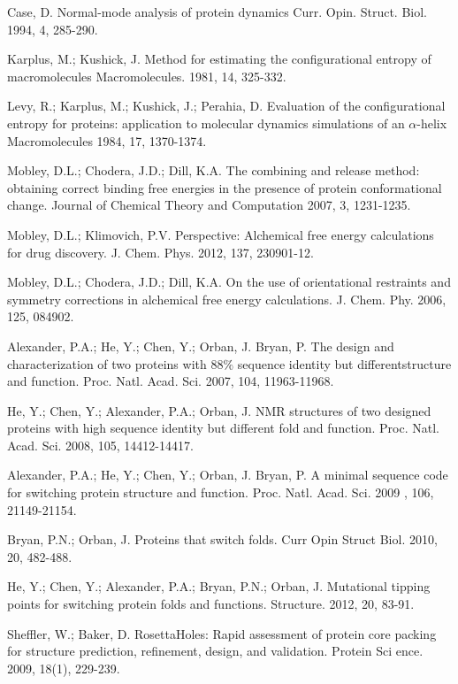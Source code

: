 \documentclass[12pt]{article}
\begin{document}
\begin{thebibliography}{99}
Case, D. Normal-mode analysis of protein dynamics Curr. Opin. Struct. Biol. 1994, 4, 285-290.

Karplus, M.; Kushick, J. Method for estimating the configurational entropy of macromolecules Macromolecules. 1981, 14, 325-332.

Levy, R.; Karplus, M.; Kushick, J.; Perahia, D. Evaluation of the configurational entropy for proteins: application to molecular dynamics simulations of 
an $\alpha$-helix Macromolecules 1984, 17, 1370-1374.

Mobley, D.L.; Chodera, J.D.; Dill, K.A. The combining and release method: obtaining correct binding free energies in
the presence of protein conformational change. Journal of Chemical Theory and Computation 2007, 3, 1231-1235.

Mobley, D.L.; Klimovich, P.V. Perspective: Alchemical free energy calculations for drug discovery.
J. Chem. Phys. 2012, 137, 230901-12.

Mobley, D.L.; Chodera, J.D.; Dill, K.A. On the use of orientational restraints and symmetry corrections in alchemical
free energy calculations. J. Chem. Phy. 2006, 125, 084902.


Alexander, P.A.; He, Y.; Chen, Y.; Orban, J. Bryan, P. The design and characterization of two proteins with $88 \%$ sequence identity but differentstructure and 
function. Proc. Natl. Acad. Sci. 2007, 104, 11963-11968.

He, Y.; Chen, Y.; Alexander, P.A.; Orban, J. NMR structures of two designed proteins with high sequence identity but different fold and function. Proc. Natl. Acad. Sci. 2008, 105, 14412-14417.

Alexander, P.A.; He, Y.; Chen, Y.; Orban, J. Bryan, P. A minimal sequence code for switching protein structure and function. Proc. Natl. Acad. Sci. 2009
, 106, 21149-21154.

Bryan, P.N.; Orban, J. Proteins that switch folds. Curr Opin Struct Biol. 2010, 20, 482-488.

He, Y.; Chen, Y.; Alexander, P.A.; Bryan, P.N.; Orban, J. Mutational tipping points for switching protein folds and functions. Structure. 2012, 20,
83-91.

Sheffler, W.; Baker, D. RosettaHoles: Rapid assessment of protein core packing for structure prediction, refinement, design, and validation. Protein Sci
ence. 2009, 18(1), 229-239.


\end{thebibliography}
\end{document}
